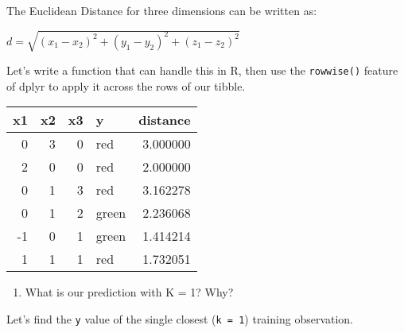 \documentclass[]{book}
\newenvironment{Shaded}{\begin{snugshade}}{\end{snugshade}}
\newcommand{\KeywordTok}[1]{\textcolor[rgb]{0.13,0.29,0.53}{\textbf{#1}}}
\newcommand{\DataTypeTok}[1]{\textcolor[rgb]{0.13,0.29,0.53}{#1}}
\newcommand{\DecValTok}[1]{\textcolor[rgb]{0.00,0.00,0.81}{#1}}
\newcommand{\StringTok}[1]{\textcolor[rgb]{0.31,0.60,0.02}{#1}}
\newcommand{\ControlFlowTok}[1]{\textcolor[rgb]{0.13,0.29,0.53}{\textbf{#1}}}
\newcommand{\OperatorTok}[1]{\textcolor[rgb]{0.81,0.36,0.00}{\textbf{#1}}}
\newcommand{\NormalTok}[1]{#1}
\providecommand{\tightlist}{%
  \setlength{\itemsep}{0pt}\setlength{\parskip}{0pt}}
\theoremstyle{definition}
\theoremstyle{definition}
\theoremstyle{definition}
\theoremstyle{remark}
\begin{document}
The Euclidean Distance for three dimensions can be written as:

\(d = \sqrt {\left( {x_1 - x_2 } \right)^2 + \left( {y_1 - y_2 } \right)^2 + \left( {z_1 - z_2 } \right)^2 }\)

Let's write a function that can handle this in R, then use the
\texttt{rowwise()} feature of dplyr to apply it across the rows of our
tibble.

\begin{Shaded}
\end{Shaded}

\begin{tabular}{r|r|r|l|r}
\hline
x1 & x2 & x3 & y & distance\\
\hline
0 & 3 & 0 & red & 3.000000\\
\hline
2 & 0 & 0 & red & 2.000000\\
\hline
0 & 1 & 3 & red & 3.162278\\
\hline
0 & 1 & 2 & green & 2.236068\\
\hline
-1 & 0 & 1 & green & 1.414214\\
\hline
1 & 1 & 1 & red & 1.732051\\
\hline
\end{tabular}

\begin{enumerate}
\def\labelenumi{(\alph{enumi})}
\setcounter{enumi}{1}
\tightlist
\item
  What is our prediction with K = 1? Why?
\end{enumerate}

Let's find the \texttt{y} value of the single closest (\texttt{k\ =\ 1})
training observation.
\end{document}
